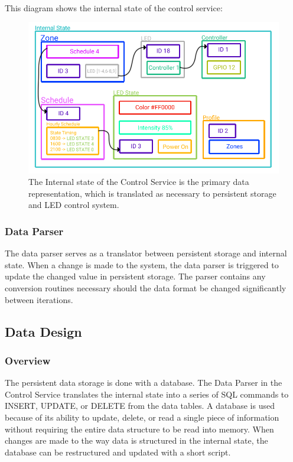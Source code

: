 \documentclass[onecolumn, draftclsnofoot,10pt, compsoc]{IEEEtran}
\begin{document}
			\noindent \\This diagram shows the internal state of the control service:

			\begin{center}
				\begin{figure}[H]
					\includegraphics[width=\linewidth]{systemDiagrams/internalstate.png}
					\caption{The Internal state of the Control Service is the primary data representation, which is translated as necessary to persistent storage and LED control system.}
					\label{fig:internalStateDiagram}
				\end{figure}
			\end{center}

			\subsubsection{Data Parser}
			The data parser serves as a translator between persistent storage and internal state.
			When a change is made to the system, the data parser is triggered to update the changed value in persistent storage.
			The parser contains any conversion routines necessary should the data format be changed significantly between iterations.


		\subsection{Data Design}
			\subsubsection{Overview}
			The persistent data storage is done with a database.
			The Data Parser in the Control Service translates the internal state into a series of SQL commands to INSERT, UPDATE, or DELETE from the data tables.
			A database is used because of its ability to update, delete, or read a single piece of information without requiring the entire data structure to be read into memory.
			When changes are made to the way data is structured in the internal state, the database can be restructured and updated with a short script.
\end{document}
